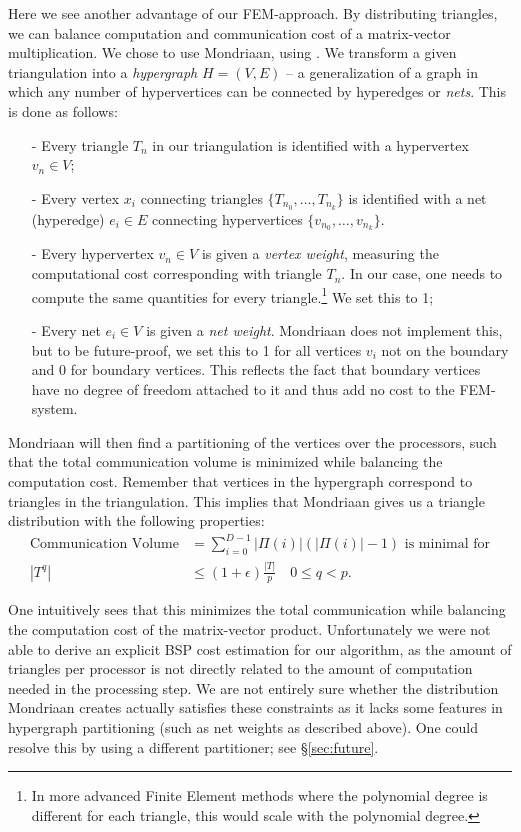 \documentclass[11pt]{amsart}
\theoremstyle{definition}
\begin{document}
Here we see another advantage of our FEM-approach. By distributing triangles, we can balance computation and communication cost of a matrix-vector multiplication. We chose to use Mondriaan, using \cite{bissmondriaan,biss2012}. We transform a given triangulation into a \emph{hypergraph} $H = (V,E)$ -- a generalization of a graph in which any number of hypervertices can be connected by hyperedges or \emph{nets}. This is done as follows:
\begin{itemize}
  \item[-] Every triangle $T_n$ in our triangulation is identified with a hypervertex $v_n \in V$;
	\item[-] Every vertex $x_i$ connecting triangles $\{T_{n_0}, \ldots, T_{n_k}\}$ is identified with a net (hyperedge) $e_i \in E$ connecting hypervertices $\{v_{n_0}, \ldots, v_{n_k}\}$.
  \item[-] Every hypervertex $v_n \in V$ is given a \emph{vertex weight}, measuring the computational cost corresponding with triangle $T_n$. In our case, one needs to compute the same quantities for every triangle.\footnote{In more advanced Finite Element methods where the polynomial degree is different for each triangle, this would scale with the polynomial degree.} We set this to 1;
  \item[-] Every net $e_i\in V$ is given a \emph{net weight}. Mondriaan does not implement this, but to be future-proof, we set this to 1 for all vertices $v_i$ not on the boundary and 0 for boundary vertices. This reflects the fact that boundary vertices have no degree of freedom attached to it and thus add no cost to the FEM-system.
\end{itemize}
Mondriaan will then find a partitioning of the vertices over the processors, such that the total communication volume is minimized while balancing the computation cost. Remember that vertices in the hypergraph correspond to triangles in the triangulation. This implies that Mondriaan gives us a triangle distribution with the following properties:
\begin{align*}
  \text{Communication Volume}&= \sum_{i=0}^{D-1} |\Pi(i)| (|\Pi(i)| -1 ) \text{ is minimal for}\\
	|T^q| & \leq (1 + \epsilon) \frac{|T|}{p} \quad 0 \leq q < p.
\end{align*}

One intuitively sees that this minimizes the total communication while balancing the computation cost of the matrix-vector product. Unfortunately we were not able to derive an explicit BSP cost estimation for our algorithm, as the amount of triangles per processor is not directly related to the amount of computation needed in the processing step. We are not entirely sure whether the distribution Mondriaan creates actually satisfies these constraints as it lacks some features in hypergraph partitioning (such as net weights as described above). One could resolve this by using a different partitioner; see \S\ref{sec:future}.
\end{document}
